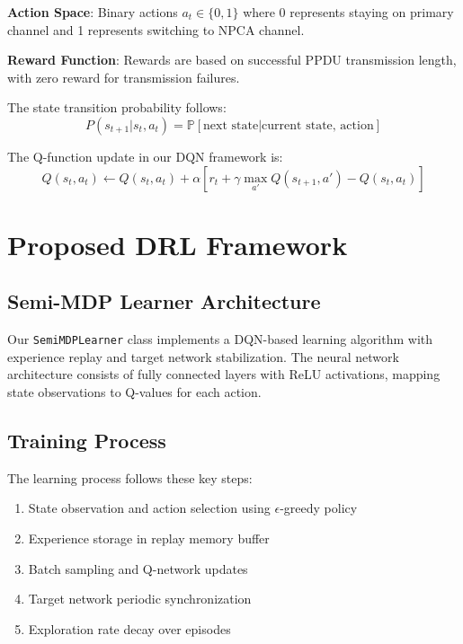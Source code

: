 \documentclass[conference]{IEEEtran}
\begin{document}
\textbf{Action Space}: Binary actions $a_t \in \{0, 1\}$ where 0 represents staying on primary channel and 1 represents switching to NPCA channel.

\textbf{Reward Function}: Rewards are based on successful PPDU transmission length, with zero reward for transmission failures.

The state transition probability follows:
\begin{equation}
P(s_{t+1}|s_t, a_t) = \mathbb{P}[\text{next state} | \text{current state, action}]\label{eq:transition}
\end{equation}

The Q-function update in our DQN framework is:
\begin{equation}
Q(s_t, a_t) \leftarrow Q(s_t, a_t) + \alpha[r_t + \gamma \max_{a'} Q(s_{t+1}, a') - Q(s_t, a_t)]\label{eq:qupdate}
\end{equation}

\section{Proposed DRL Framework}

\subsection{Semi-MDP Learner Architecture}

Our \texttt{SemiMDPLearner} class implements a DQN-based learning algorithm with experience replay and target network stabilization. The neural network architecture consists of fully connected layers with ReLU activations, mapping state observations to Q-values for each action.

\subsection{Training Process}

The learning process follows these key steps:
\begin{enumerate}
\item State observation and action selection using $\epsilon$-greedy policy
\item Experience storage in replay memory buffer
\item Batch sampling and Q-network updates
\item Target network periodic synchronization
\item Exploration rate decay over episodes
\end{enumerate}
\end{document}
